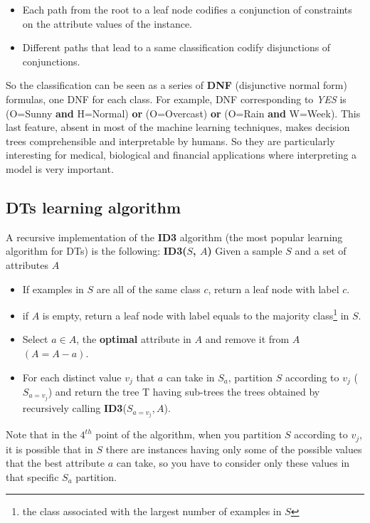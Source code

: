\begin{itemize}
    \item Each path from the root to a leaf node codifies a conjunction of constraints on the attribute values of the instance.
    \item Different paths that lead to a same classification codify disjunctions of conjunctions.
\end{itemize}
So the classification can be seen as a series of \textbf{DNF} (disjunctive normal form) formulas, one DNF for each class. For example, DNF corresponding to \textit{YES} is (O=Sunny \textbf{and} H=Normal) \textbf{or} (O=Overcast) \textbf{or} (O=Rain \textbf{and} W=Week). This last feature, absent in most of the machine learning techniques, makes decision trees comprehensible and interpretable by humans. So they are particularly interesting for medical, biological and financial applications where interpreting a model is very important.
\subsection{DTs learning algorithm}
A recursive implementation of the \textbf{ID3} algorithm (the most popular learning algorithm for DTs) is the following:\newline
\textbf{ID3($S$, $A$)} Given a sample $S$ and a set of attributes $A$
\begin{itemize}
    \item If examples in $S$ are all of the same class $c$, return a leaf node with label $c$.
    \item if $A$ is empty, return a leaf node with label equals to the majority class\footnote{the class associated with the largest number of examples in $S$} in $S$.
    \item Select $a \in A$, the \textbf{optimal} attribute in $A$ and remove it from $A$ $(A = A - a)$.
    \item For each distinct value $v_{j}$ that $a$ can take in $S_{a}$, partition $S$ according to $v_{j}$ ($S_{a=v_{j}}$) and return the tree T having sub-trees the trees obtained by recursively calling \textbf{ID3}($S_{a=v_{j}}, A$).
\end{itemize}
Note that in the $4^{th}$ point of the algorithm, when you partition $S$ according to $v_{j}$, it is possible that in $S$ there are instances having only some of the possible values that the best attribute $a$ can take, so you have to consider only these values in that specific $S_{a}$ partition.

